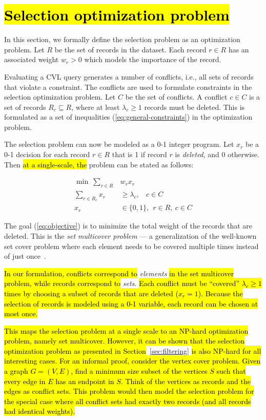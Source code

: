 \section{\hl{Selection optimization problem}}
\label{sec:optimizationmodel}

In this section, we formally define the selection problem as an optimization problem. Let $R$ be the set of records in the dataset. Each record $r \in R$ has an associated weight $w_r > 0$ which models the importance of the record. 

Evaluating a CVL query generates a number of conflicts, i.e., all sets of records that violate a constraint. The conflicts are used to formulate constraints in the selection optimization problem. Let $C$ be the set of conflicts. A conflict $c \in C$ is a set of records $R_c \subseteq R$, where at least $\lambda_c \geq 1$ records must be deleted. This is formulated as a set of inequalities (\ref{eq:general-constraints}) in the optimization problem.

The selection problem can now be modeled as a 0-1 integer program. Let $x_r$ be a 0-1 decision for each record $r \in R$ that is 1 if record $r$ is \emph{deleted}, and 0 otherwise. Then \hl{at a single-scale, the} problem can be stated as follows:

\begin{align}
  \label{eq:objective}
  \min ~\sum_{r \in R} &w_r x_r \\
  \label{eq:general-constraints}
  \sum_{r \in R_c} x_r &\geq \lambda_c, ~~~~ c \in C \\
  x_r & \in \{0, 1\}, ~~ r \in R, ~c \in C
\end{align}

The goal (\ref{eq:objective}) is to minimize the total weight of the records that are deleted. This is the \emph{set multicover problem} --- a generalization of the well-known set cover problem where each element needs to be covered multiple times instead of just once~\cite{rajagopalan1998primal}. 

\hl{In our formulation, conflicts correspond to }\textit{elements}\hl{ in the set multicover problem, while records correspond to }\textit{sets}.\hl{ Each conflict must be ``covered'' $\lambda_c \geq 1$ times by choosing a subset of records that are deleted ($x_r=1$). Because the selection of records is modeled using a 0-1 variable, each record can be chosen at most once.}

\hl{This maps the selection problem at a single scale to an NP-hard optimization problem, namely set multicover. However, it can be shown that the selection optimization problem as presented in Section}~\ref{sec:filtering}\hl{ is also NP-hard for all interesting cases. For an informal proof, consider the vertex cover problem. Given a graph $G=(V,E)$, find a minimum size subset of the vertices $S$ such that every edge in $E$ has an endpoint in $S$. Think of the vertices as records and the edges as conflict sets. This problem would then model the selection problem for the special case where all conflict sets had exactly two records (and all records had identical weights).}

